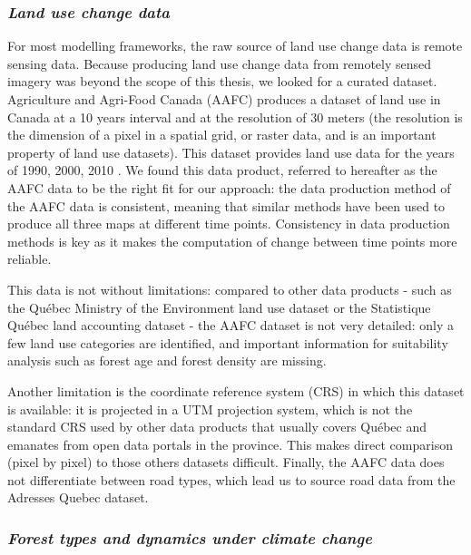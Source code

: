 \subsubsection*{\textit{Land use change data}}

For most modelling frameworks, the raw source of land use change data is remote sensing data. Because producing land use change data from remotely sensed imagery was beyond the scope of this thesis, we looked for a curated dataset. Agriculture and Agri-Food Canada (AAFC) produces a dataset of land use in Canada at a 10 years interval and at the resolution of 30 meters (the resolution is the dimension of a pixel in a spatial grid, or raster data, and is an important property of land use datasets). This dataset provides land use data for the years of 1990, 2000, 2010 \citep{aafc_land_2020}. We found this data product, referred to hereafter as the AAFC data  to be the right fit for our approach: the data production method of the AAFC  data is consistent, meaning that similar methods have been used to produce all three maps at different time points. Consistency in data production methods is key as it makes the computation of change between time points more reliable.

This data is not without limitations: compared to other data products - such as the Québec Ministry of the Environment land use dataset or the Statistique Québec land accounting dataset - the AAFC dataset is not very detailed: only a few land use categories are identified, and important information for suitability analysis such as forest age and forest density are missing.

Another limitation is the coordinate reference system (CRS) in which this dataset is available: it is projected in a UTM projection system, which is not the standard CRS used by other data products that usually covers Québec and emanates from open data portals in the province. This makes direct comparison (pixel by pixel) to those others datasets difficult. Finally, the AAFC data does not differentiate between road types, which lead us to source road data from the Adresses Quebec dataset.\\

\subsubsection*{\textit{Forest types and dynamics under climate change}}

